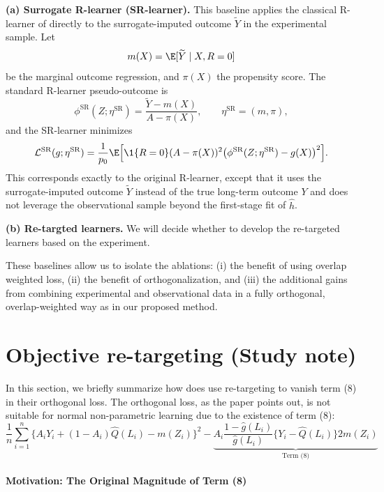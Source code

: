 \documentclass{article} %
\theoremstyle{plain} %
\theoremstyle{definition} %
\theoremstyle{remark} %
\begin{document}
\medskip
\noindent\textbf{(a) Surrogate R-learner (SR-learner).}
This baseline applies the classical R-learner of \citet{Nie.2021} directly to the surrogate-imputed outcome $\widetilde{Y}$ in the experimental sample. Let
\[
m(X)=\E[\widetilde{Y}\mid X,R=0]
\]
be the marginal outcome regression, and $\pi(X)$ the propensity score. The standard R-learner pseudo-outcome is
\[
\phi^{\mathrm{SR}}(Z;\eta^{\mathrm{SR}})
  = \frac{\widetilde{Y}-m(X)}{A-\pi(X)},
  \qquad \eta^{\mathrm{SR}}=(m,\pi),
\]
and the SR-learner minimizes
\[
\mathcal{L}^{\mathrm{SR}}(g;\eta^{\mathrm{SR}})
  = \frac{1}{p_0}\E\Big[
      \1\{R=0\}(A-\pi(X))^2
      \bigl(\phi^{\mathrm{SR}}(Z;\eta^{\mathrm{SR}})-g(X)\bigr)^2
    \Big].
\]
This corresponds exactly to the original R-learner, except that it uses the surrogate-imputed outcome $\widetilde{Y}$ instead of the true long-term outcome $Y$ and does not leverage the observational sample beyond the first-stage fit of $\widehat{h}$.

\medskip
\noindent\textbf{(b) Re-targted learners.}
We will decide whether to develop the re-targeted learners based on the experiment.

\medskip
These baselines allow us to isolate the ablations: (i) the benefit of using overlap weighted loss, (ii) the benefit of orthogonalization, and (iii) the additional gains from combining experimental and observational data in a fully orthogonal, overlap-weighted way as in our proposed method.






\section{Objective re-targeting (Study note)}
In this section, we briefly summarize how does \citet{Vansteelandt.2023} use re-targeting to vanish term (8) in their orthogonal loss. The orthogonal loss, as the paper points out, is not suitable for normal non-parametric learning due to the existence of term (8):
\begin{equation}
\frac{1}{n}\sum_{i=1}^{n}\{A_{i}Y_{i}+(1-A_{i})\hat{Q}(L_{i})-m(Z_{i})\}^{2}-\underbrace{A_{i}\frac{1-\hat{g}(L_{i})}{\hat{g}(L_{i})}\{Y_{i}-\hat{Q}(L_{i})\}2m(Z_{i})}_{\text{Term (8)}}
\tag{7}
\end{equation}

\paragraph{Motivation: The Original Magnitude of Term (8)}
\end{document}
